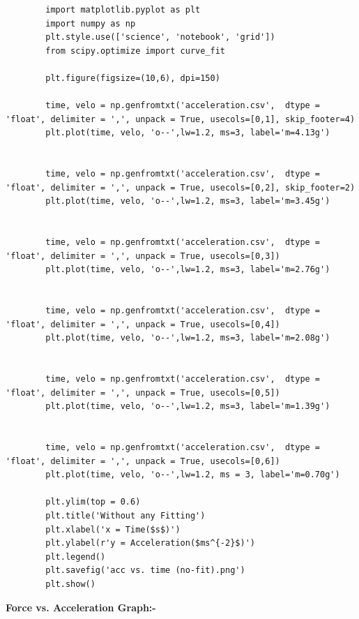 \documentclass{article}
\begin{document}
 	\begin{lstlisting}
 		import matplotlib.pyplot as plt
 		import numpy as np
 		plt.style.use(['science', 'notebook', 'grid'])
 		from scipy.optimize import curve_fit
 		
 		plt.figure(figsize=(10,6), dpi=150)
 		
 		time, velo = np.genfromtxt('acceleration.csv',  dtype = 'float', delimiter = ',', unpack = True, usecols=[0,1], skip_footer=4)
 		plt.plot(time, velo, 'o--',lw=1.2, ms=3, label='m=4.13g')
 		
 		
 		time, velo = np.genfromtxt('acceleration.csv',  dtype = 'float', delimiter = ',', unpack = True, usecols=[0,2], skip_footer=2)
 		plt.plot(time, velo, 'o--',lw=1.2, ms=3, label='m=3.45g')
 		
 		
 		time, velo = np.genfromtxt('acceleration.csv',  dtype = 'float', delimiter = ',', unpack = True, usecols=[0,3])
 		plt.plot(time, velo, 'o--',lw=1.2, ms=3, label='m=2.76g')
 		
 		
 		time, velo = np.genfromtxt('acceleration.csv',  dtype = 'float', delimiter = ',', unpack = True, usecols=[0,4])
 		plt.plot(time, velo, 'o--',lw=1.2, ms=3, label='m=2.08g')
 		
 		
 		time, velo = np.genfromtxt('acceleration.csv',  dtype = 'float', delimiter = ',', unpack = True, usecols=[0,5])
 		plt.plot(time, velo, 'o--',lw=1.2, ms=3, label='m=1.39g')
 		
 		
 		time, velo = np.genfromtxt('acceleration.csv',  dtype = 'float', delimiter = ',', unpack = True, usecols=[0,6])
 		plt.plot(time, velo, 'o--',lw=1.2, ms = 3, label='m=0.70g')
 		
 		plt.ylim(top = 0.6)
 		plt.title('Without any Fitting')
 		plt.xlabel('x = Time($s$)')
 		plt.ylabel(r'y = Acceleration($ms^{-2}$)')
 		plt.legend()
 		plt.savefig('acc vs. time (no-fit).png')
 		plt.show()
 	\end{lstlisting}
 
 	\pagebreak
 
 	\textbf{Force vs. Acceleration Graph:-}
 	
\end{document}
